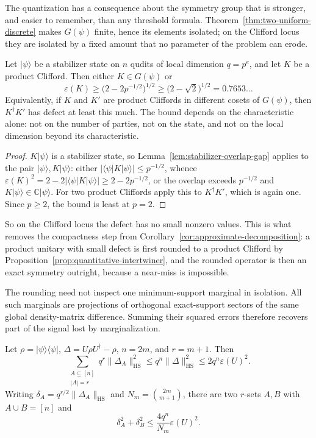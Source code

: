 The quantization has a consequence about the symmetry group that is
stronger, and easier to remember, than any threshold formula.
Theorem~\ref{thm:two-uniform-discrete} makes \(G(\psi)\) finite, hence its
elements isolated; on the Clifford locus they are isolated by a fixed
amount that no parameter of the problem can erode.

\begin{corollary}
\label{cor:uniform-separation}
Let \(\lvert\psi\rangle\) be a stabilizer state on \(n\) qudits of local
dimension \(q=p^e\), and let \(K\) be a product Clifford.  Then either
\(K\in G(\psi)\) or
\[
 \varepsilon(K)\geq\bigl(2-2p^{-1/2}\bigr)^{1/2}\geq\bigl(2-\sqrt2\bigr)^{1/2}
  =0.7653\ldots
\]
Equivalently, if \(K\) and \(K'\) are product Cliffords in different cosets
of \(G(\psi)\), then \(K^\dagger K'\) has defect at least this much.  The
bound depends on the characteristic alone: not on the number of parties,
not on the state, and not on the local dimension beyond its
characteristic.
\end{corollary}

\begin{proof}
\(K\lvert\psi\rangle\) is a stabilizer state, so
Lemma~\ref{lem:stabilizer-overlap-gap} applies to the pair
\(\lvert\psi\rangle,K\lvert\psi\rangle\): either
\(\lvert\langle\psi\rvert K\lvert\psi\rangle\rvert\leq p^{-1/2}\), whence
\(\varepsilon(K)^2=2-2\lvert\langle\psi\rvert K\lvert\psi\rangle\rvert
\geq2-2p^{-1/2}\), or the overlap exceeds \(p^{-1/2}\) and
\(K\lvert\psi\rangle\in\mathbb C\lvert\psi\rangle\).  For two product
Cliffords apply this to \(K^\dagger K'\), which is again one.  Since
\(p\geq2\), the bound is least at \(p=2\).
\end{proof}

So on the Clifford locus the defect has no small nonzero values.  This is
what removes the compactness step from
Corollary~\ref{cor:approximate-decomposition}: a product unitary with small
defect is first rounded to a product Clifford by
Proposition~\ref{prop:quantitative-intertwiner}, and the rounded operator
is then an exact symmetry outright, because a near-miss is impossible.

The rounding need not inspect one minimum-support marginal in isolation.
All such marginals are projections of orthogonal exact-support sectors of
the same global density-matrix difference.  Summing their squared errors
therefore recovers part of the signal lost by marginalization.

\begin{lemma}
\label{lem:collective-support-energy}
Let \(\rho=\lvert\psi\rangle\langle\psi\rvert\),
\(\Delta=U\rho U^\dagger-\rho\), \(n=2m\), and \(r=m+1\).  Then
\[
 \sum_{\substack{A\subseteq[n]\\|A|=r}}
 q^r\lVert\Delta_A\rVert_{\mathrm{HS}}^2
 \leq q^n\lVert\Delta\rVert_{\mathrm{HS}}^2
 \leq2q^n\varepsilon(U)^2.                       \tag{5.7}
\]
Writing \(\delta_A=q^{r/2}\lVert\Delta_A\rVert_{\mathrm{HS}}\) and
\(N_m=\binom{2m}{m+1}\), there are two \(r\)-sets \(A,B\) with
\(A\cup B=[n]\) and
\[
 \delta_A^2+\delta_B^2
 \leq \frac{4q^n}{N_m}\varepsilon(U)^2.          \tag{5.8}
\]
\end{lemma}

